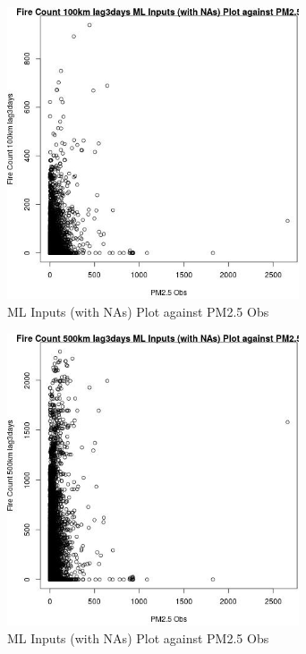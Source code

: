 \begin{figure} 
\centering  
\includegraphics[width=0.77\textwidth]{Code_Outputs/Report_ML_input_PM25_Step4_part_e_de_duplicated_aves_compiled_2019-05-21wNAs_Fire_Count_100km_lag3daysvPM25_Obs.jpg} 
\caption{\label{fig:Report_ML_input_PM25_Step4_part_e_de_duplicated_aves_compiled_2019-05-21wNAsFire_Count_100km_lag3daysvPM25_Obs}ML Inputs (with NAs) Plot against PM2.5 Obs} 
\end{figure} 
 

\begin{figure} 
\centering  
\includegraphics[width=0.77\textwidth]{Code_Outputs/Report_ML_input_PM25_Step4_part_e_de_duplicated_aves_compiled_2019-05-21wNAs_Fire_Count_500km_lag3daysvPM25_Obs.jpg} 
\caption{\label{fig:Report_ML_input_PM25_Step4_part_e_de_duplicated_aves_compiled_2019-05-21wNAsFire_Count_500km_lag3daysvPM25_Obs}ML Inputs (with NAs) Plot against PM2.5 Obs} 
\end{figure} 
 

